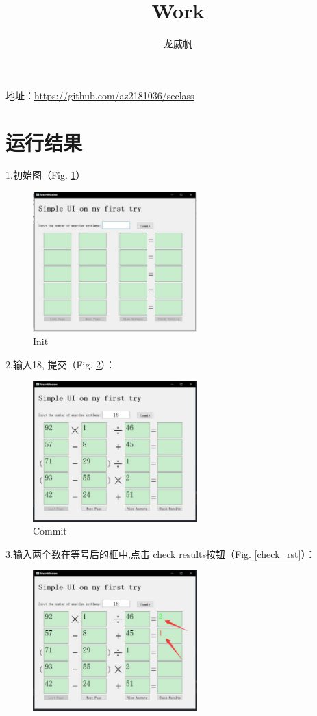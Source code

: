 \documentclass[10pt,journal,compsoc,fleqn]{IEEEtran}
\begin{document}
\begin{CJK}{UTF8}{song}
\title{Work}
\author{龙威帆}
\maketitle

地址：\url{https://github.com/az2181036/seclass}
\section*{运行结果}
1.初始图（Fig. \ref{init}）
\begin{figure}[H]
  \centering
  \includegraphics[width=2.5in]{./figures/init.pdf}
  \caption{Init}
  \label{init}
\end{figure}
\noindent 2.输入18, 提交（Fig. \ref{Commit}）：
\begin{figure}[H]
  \centering
  \includegraphics[width=2.5in]{./figures/commit.pdf}
  \caption{Commit}
  \label{Commit}
\end{figure}
\noindent 3.输入两个数在等号后的框中,点击 check results按钮（Fig. \ref{check_rst}）：
\begin{figure}[H]
  \centering
  \includegraphics[width=2.5in]{./figures/check_rst.pdf}

\end{figure}
\end{CJK}
\end{document}
